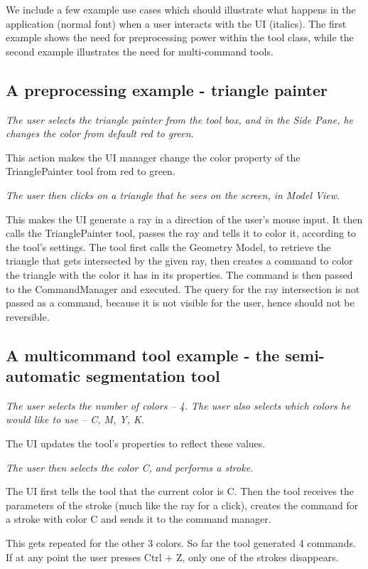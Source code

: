 We include a few example use cases which should illustrate what happens in the application (normal font) when a user interacts with the UI (italics). The first example shows the need for preprocessing power within the tool class, while the second example illustrates the need for multi-command tools.

\subsection{A preprocessing example - triangle painter}
\textit{The user selects the triangle painter from the tool box, and in the Side Pane, he changes the color from default red to green.}

This action makes the UI manager change the color property of the TrianglePainter tool from red to green.

\textit{The user then clicks on a triangle that he sees on the screen, in Model View.}

This makes the UI generate a ray in a direction of the user's mouse input. It then calls the TrianglePainter tool, passes the ray and tells it to color it, according to the tool's settings. The tool first calls the Geometry Model, to retrieve the triangle that gets intersected by the given ray, then creates a command to color the triangle with the color it has in its properties. The command is then passed to the CommandManager and executed. The query for the ray intersection is not passed as a command, because it is not visible for the user, hence should not be reversible.

\subsection{A multicommand tool example - the semi-automatic segmentation tool}
\textit{The user selects the number of colors -- 4. The user also selects which colors he would like to use -- C, M, Y, K.}

The UI updates the tool's properties to reflect these values.

\textit{The user then selects the color C, and performs a stroke.}

The UI first tells the tool that the current color is C. Then the tool receives the parameters of the stroke (much like the ray for a click), creates the command for a stroke with color C and sends it to the command manager.

This gets repeated for the other 3 colors. So far the tool generated 4 commands. If at any point the user presses Ctrl + Z, only one of the strokes disappears.

